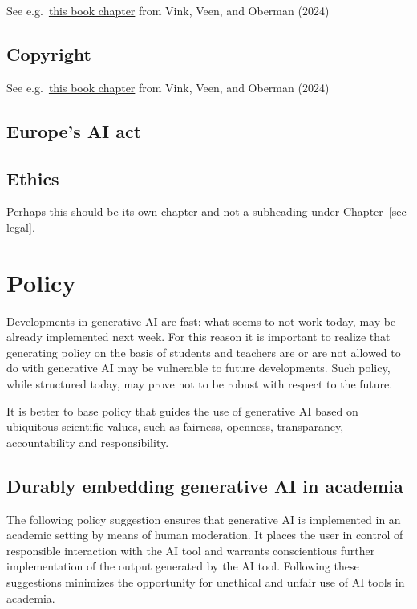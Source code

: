 \documentclass[
  letterpaper,
  DIV=11,
  numbers=noendperiod]{scrreprt}
\begin{document}
See
e.g.~\href{https://www.gerkovink.com/openeducationbook/licensing.html}{this
book chapter} from Vink, Veen, and Oberman (2024)

\section{Copyright}\label{copyright}

See
e.g.~\href{https://www.gerkovink.com/openeducationbook/licensing.html}{this
book chapter} from Vink, Veen, and Oberman (2024)

\section{Europe's AI act}\label{europes-ai-act}

\section{Ethics}\label{ethics}

Perhaps this should be its own chapter and not a subheading under
Chapter~\ref{sec-legal}.


\chapter{Policy}\label{policy}

Developments in generative AI are fast: what seems to not work today,
may be already implemented next week. For this reason it is important to
realize that generating policy on the basis of students and teachers are
or are not allowed to do with generative AI may be vulnerable to future
developments. Such policy, while structured today, may prove not to be
robust with respect to the future.

It is better to base policy that guides the use of generative AI based
on ubiquitous scientific values, such as fairness, openness,
transparancy, accountability and responsibility.

\section{Durably embedding generative AI in
academia}\label{durably-embedding-generative-ai-in-academia}

The following policy suggestion ensures that generative AI is
implemented in an academic setting by means of human moderation. It
places the user in control of responsible interaction with the AI tool
and warrants conscientious further implementation of the output
generated by the AI tool. Following these suggestions minimizes the
opportunity for unethical and unfair use of AI tools in academia.
\end{document}
